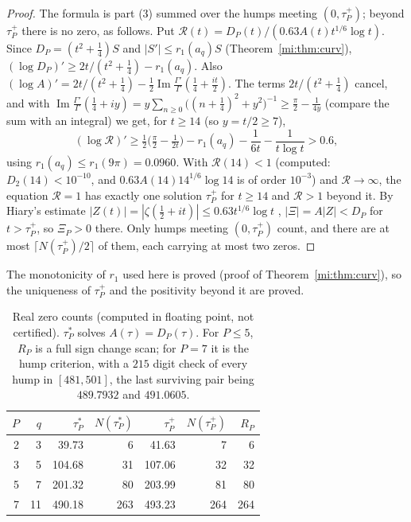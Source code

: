 \begin{proof}
The formula is part (3) summed over the humps meeting $(0,\tau_P^+)$; beyond $\tau_P^+$ there is no zero, as follows. Put $\mathcal R(t)=D_P(t)/(0.63A(t)t^{1/6}\log t)$. Since $D_P=(t^2+\tfrac14)S$ and $|S'|\le r_1(a_q)S$ (Theorem~\ref{mi:thm:curv}), $(\log D_P)'\ge2t/(t^2+\tfrac14)-r_1(a_q)$. Also $(\log A)'=2t/(t^2+\tfrac14)-\tfrac12\operatorname{Im}\frac{\Gamma'}\Gamma(\tfrac14+\tfrac{it}2)$. The terms $2t/(t^2+\tfrac14)$ cancel, and with $\operatorname{Im}\frac{\Gamma'}\Gamma(\tfrac14+iy)=y\sum_{n\ge0}\big((n+\tfrac14)^2+y^2\big)^{-1}\ge\tfrac\pi2-\tfrac1{4y}$ (compare the sum with an integral) we get, for $t\ge14$ (so $y=t/2\ge7$),
\[
(\log\mathcal R)'\ge\tfrac12\Big(\tfrac\pi2-\tfrac1{2t}\Big)-r_1(a_q)-\frac1{6t}-\frac1{t\log t}>0.6,
\]
using $r_1(a_q)\le r_1(9\pi)=0.0960$. With $\mathcal R(14)<1$ (computed: $D_2(14)<10^{-10}$, and $0.63A(14)14^{1/6}\log14$ is of order $10^{-3}$) and $\mathcal R\to\infty$, the equation $\mathcal R=1$ has exactly one solution $\tau_P^+$ for $t\ge14$ and $\mathcal R>1$ beyond it. By Hiary's estimate $|Z(t)|=|\zeta(\tfrac12+it)|\le0.63t^{1/6}\log t$ \cite{Hiary16}, $|\Xi|=A|Z|<D_P$ for $t>\tau_P^+$, so $\Xi_P>0$ there. Only humps meeting $(0,\tau_P^+)$ count, and there are at most $\lceil N(\tau_P^+)/2\rceil$ of them, each carrying at most two zeros.
\end{proof}

The monotonicity of $r_1$ used here is proved (proof of Theorem~\ref{mi:thm:curv}), so the uniqueness of $\tau_P^+$ and the positivity beyond it are proved.

\begin{table}[ht]
\centering
\footnotesize
\setlength{\tabcolsep}{4pt}
\begin{tabular}{rrrrrrr}
\toprule
$P$ & $q$ & $\tau_P^*$ & $N(\tau_P^*)$ & $\tau_P^+$ & $N(\tau_P^+)$ & $R_P$ \\
\midrule
2 & 3 & 39.73 & 6 & 41.63 & 7 & 6 \\
3 & 5 & 104.68 & 31 & 107.06 & 32 & 32 \\
5 & 7 & 201.32 & 80 & 203.99 & 81 & 80 \\
7 & 11 & 490.18 & 263 & 493.23 & 264 & 264 \\
\bottomrule
\end{tabular}
\caption{Real zero counts (computed in floating point, not certified). $\tau_P^*$ solves $A(\tau)=D_P(\tau)$. For $P\le5$, $R_P$ is a full sign change scan; for $P=7$ it is the hump criterion, with a $215$ digit check of every hump in $[481,501]$, the last surviving pair being $489.7932$ and $491.0605$.}
\label{mi:tab:count}
\end{table}

